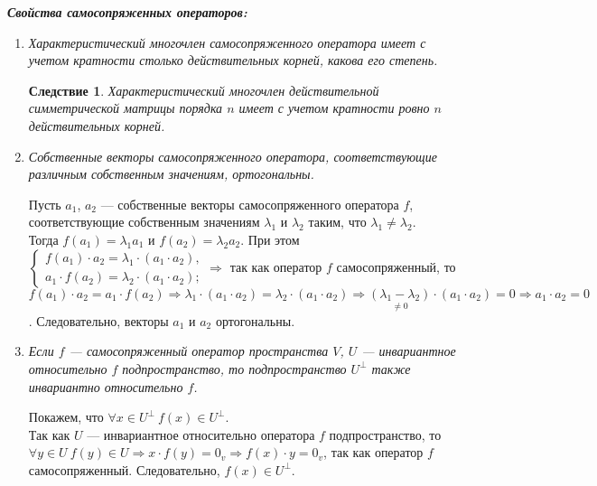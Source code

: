 \textbf{\textit{Свойства самосопряженных операторов:}}\begin{enumerate}
	\item \textit{Характеристический многочлен самосопряженного оператора имеет с учетом кратности столько действительных корней, какова его степень.}
	\newtheorem*{cor14_6_1}{Следствие}\begin{cor14_6_1}Характеристический многочлен действительной симметрической матрицы порядка $n$ имеет с учетом кратности ровно $n$ действительных корней.
	\end{cor14_6_1}
	\item \textit{Собственные векторы самосопряженного оператора, соответствующие различным собственным значениям, ортогональны.}\begin{Proof}
		Пусть $a_1$, $a_2$ --- собственные векторы самосопряженного оператора $f$, соответствующие собственным значениям $\lambda_1$ и $\lambda_2$ таким, что $\lambda_1 \neq \lambda_2$. \\Тогда $f(a_1)=\lambda_1a_1$ и $f(a_2)=\lambda_2a_2$. При этом\\
		$\begin{cases}
			f(a_1)\cdot a_2=\lambda_1\cdot (a_1\cdot a_2),\\
			a_1\cdot f(a_2)=\lambda_2\cdot (a_1\cdot a_2);
		\end{cases}\Rightarrow$ так как оператор $f$ самосопряженный, то $f(a_1)\cdot a_2 = a_1\cdot f(a_2)\Rightarrow\lambda_1\cdot (a_1\cdot a_2)=\lambda_2\cdot (a_1\cdot a_2)\Rightarrow \underset{\ne 0}{(\lambda_1-\lambda_2)}\cdot (a_1\cdot a_2)=0\Rightarrow a_1\cdot a_2=0$. Следовательно, векторы $a_1$ и $a_2$ ортогональны.
	\end{Proof}
	\item \textit{Если $f$ --- самосопряженный оператор пространства $V$, $U$ --- инвариантное относительно $f$ подпространство, то подпространство $U^\perp$ также инвариантно относительно $f$.}\begin{Proof}
		Покажем, что $\forall x \in U^\perp\ f(x)\in U^\perp$.\\
		Так как $U$ --- инвариантное относительно оператора $f$ подпространство, то $\forall y\in U\ f(y) \in U\Rightarrow x\cdot f(y) = 0_v\Rightarrow f(x)\cdot y = 0_v$, так как оператор $f$ самосопряженный. Следовательно, $f(x)\in U^\perp$.
	\end{Proof}
\end{enumerate}
